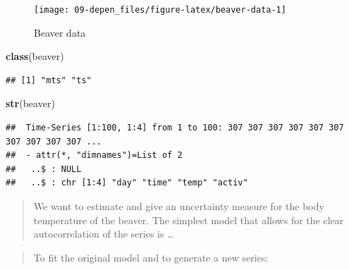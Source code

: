 \documentclass[]{book}
\newenvironment{Shaded}{\begin{snugshade}}{\end{snugshade}}
\newcommand{\KeywordTok}[1]{\textcolor[rgb]{0.13,0.29,0.53}{\textbf{#1}}}
\newcommand{\NormalTok}[1]{#1}
\theoremstyle{definition}
\theoremstyle{definition}
\theoremstyle{definition}
\theoremstyle{remark}
\begin{document}
\begin{figure}[!htb]

{\centering \texttt{[image: 09-depen\_files/figure-latex/beaver-data-1]} 

}

\caption{Beaver data}\label{fig:beaver-data}
\end{figure}

\begin{Shaded}
\begin{Highlighting}[]
\KeywordTok{class}\NormalTok{(beaver)}
\end{Highlighting}
\end{Shaded}

\begin{verbatim}
## [1] "mts" "ts"
\end{verbatim}

\begin{Shaded}
\begin{Highlighting}[]
\KeywordTok{str}\NormalTok{(beaver) }
\end{Highlighting}
\end{Shaded}

\begin{verbatim}
##  Time-Series [1:100, 1:4] from 1 to 100: 307 307 307 307 307 307 307 307 307 307 ...
##  - attr(*, "dimnames")=List of 2
##   ..$ : NULL
##   ..$ : chr [1:4] "day" "time" "temp" "activ"
\end{verbatim}

\begin{quote}
We want to estimate and give an uncertainty measure for the body
temperature of the beaver. The simplest model that allows for the clear
autocorrelation of the series is \ldots{}
\end{quote}

\begin{quote}
To fit the original model and to generate a new series:
\end{quote}
\end{document}
